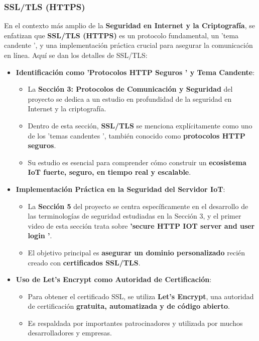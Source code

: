 \documentclass{report}
\begin{document}
\subsubsection{SSL/TLS (HTTPS)}
En el contexto más amplio de la \textbf{Seguridad en Internet y la Criptografía}, se  enfatizan que \textbf{SSL/TLS (HTTPS)} es un protocolo 
fundamental, un  'tema candente ', y una implementación práctica crucial para asegurar la comunicación en línea. Aquí se dan los detalles de SSL/TLS:

\begin{itemize}
    \item \textbf{Identificación como  'Protocolos HTTP Seguros ' y Tema Candente}:
    \begin{itemize}
        \item La \textbf{Sección 3: Protocolos de Comunicación y Seguridad} del proyecto se dedica a un estudio en profundidad de la seguridad en 
        Internet y la criptografía.
        \item Dentro de esta sección, \textbf{SSL/TLS} se menciona explícitamente como uno de los  'temas candentes ', también conocido como 
        \textbf{protocolos HTTP seguros}.
        \item Su estudio es esencial para comprender cómo construir un \textbf{ecosistema IoT fuerte, seguro, en tiempo real y escalable}.
    \end{itemize}

    \item \textbf{Implementación Práctica en la Seguridad del Servidor IoT}:
    \begin{itemize}
        \item La \textbf{Sección 5} del proyecto se centra específicamente en el desarrollo de las terminologías de seguridad estudiadas en la 
        Sección 3, y el primer video de esta sección trata sobre \textbf{ 'secure HTTP IOT server and user login '}.
        \item El objetivo principal es \textbf{asegurar un dominio personalizado} recién creado con \textbf{certificados SSL/TLS}.
    \end{itemize}

    \item \textbf{Uso de Let's Encrypt como Autoridad de Certificación}:
    \begin{itemize}
        \item Para obtener el certificado SSL, se utiliza \textbf{Let's Encrypt}, una autoridad de certificación \textbf{gratuita, 
        automatizada y de código abierto}.
        \item Es respaldada por importantes patrocinadores y utilizada por muchos desarrolladores y empresas.
    \end{itemize}


\end{itemize}
\end{document}

